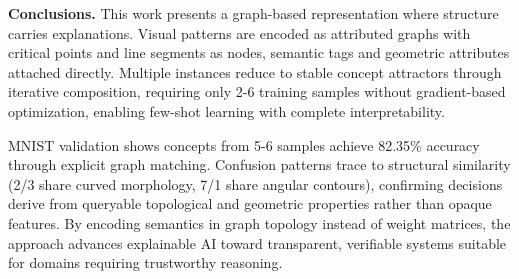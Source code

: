 \documentclass[12pt,a4paper]{article}
\begin{document}
\textbf{Conclusions.} This work presents a graph-based representation where structure carries explanations. Visual patterns are encoded as attributed graphs with critical points and line segments as nodes, semantic tags and geometric attributes attached directly. Multiple instances reduce to stable concept attractors through iterative composition, requiring only 2-6 training samples without gradient-based optimization, enabling few-shot learning with complete interpretability.

MNIST validation shows concepts from 5-6 samples achieve 82.35\% accuracy through explicit graph matching. Confusion patterns trace to structural similarity (2/3 share curved morphology, 7/1 share angular contours), confirming decisions derive from queryable topological and geometric properties rather than opaque features. By encoding semantics in graph topology instead of weight matrices, the approach advances explainable AI toward transparent, verifiable systems suitable for domains requiring trustworthy reasoning.



\end{document}
